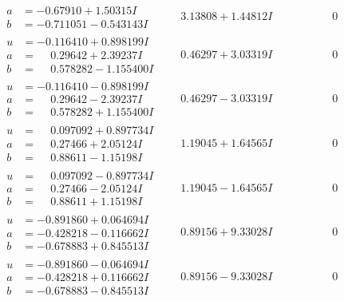 \documentclass[1p]{elsarticle_modified}
\theoremstyle{definition}
\begin{document}
$$\begin{array}{c|c|c}
\begin{aligned}
a &= -0.67910 + 1.50315 I \\
b &= -0.711051 - 0.543143 I\end{aligned}
 & \phantom{-}3.13808 + 1.44812 I & \phantom{-0.000000 } 0 \\ \hline\begin{aligned}
u &= -0.116410 + 0.898199 I \\
a &= \phantom{-}0.29642 + 2.39237 I \\
b &= \phantom{-}0.578282 - 1.155400 I\end{aligned}
 & \phantom{-}0.46297 + 3.03319 I & \phantom{-0.000000 } 0 \\ \hline\begin{aligned}
u &= -0.116410 - 0.898199 I \\
a &= \phantom{-}0.29642 - 2.39237 I \\
b &= \phantom{-}0.578282 + 1.155400 I\end{aligned}
 & \phantom{-}0.46297 - 3.03319 I & \phantom{-0.000000 } 0 \\ \hline\begin{aligned}
u &= \phantom{-}0.097092 + 0.897734 I \\
a &= \phantom{-}0.27466 + 2.05124 I \\
b &= \phantom{-}0.88611 - 1.15198 I\end{aligned}
 & \phantom{-}1.19045 + 1.64565 I & \phantom{-0.000000 } 0 \\ \hline\begin{aligned}
u &= \phantom{-}0.097092 - 0.897734 I \\
a &= \phantom{-}0.27466 - 2.05124 I \\
b &= \phantom{-}0.88611 + 1.15198 I\end{aligned}
 & \phantom{-}1.19045 - 1.64565 I & \phantom{-0.000000 } 0 \\ \hline\begin{aligned}
u &= -0.891860 + 0.064694 I \\
a &= -0.428218 - 0.116662 I \\
b &= -0.678883 + 0.845513 I\end{aligned}
 & \phantom{-}0.89156 + 9.33028 I & \phantom{-0.000000 } 0 \\ \hline\begin{aligned}
u &= -0.891860 - 0.064694 I \\
a &= -0.428218 + 0.116662 I \\
b &= -0.678883 - 0.845513 I\end{aligned}
 & \phantom{-}0.89156 - 9.33028 I & \phantom{-0.000000 } 0 \\ \hline\begin{aligned}

\end{aligned}
\end{array}$$
\end{document}
